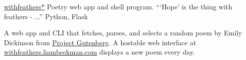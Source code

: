 \showoff
{\textcolor{my-blue}{\href{https://withfeathers.liambeckman.com}{withfeathers\textcolor{my-red}{*}}}}
{Poetry web app and shell program. ```Hope' is the thing with feathers - ...''}
{Python, Flask}
{}

A web app and CLI that fetches, parses, and selects a random poem by Emily Dickinson from \textcolor{my-blue}{\href{https://www.gutenberg.org/ebooks/12242}{Project Gutenberg}}. A hostable web interface at \textcolor{my-blue}{\href{https://withfeathers.liambeckman.com}{withfeathers.liambeckman.com}} displays a new poem every day.

